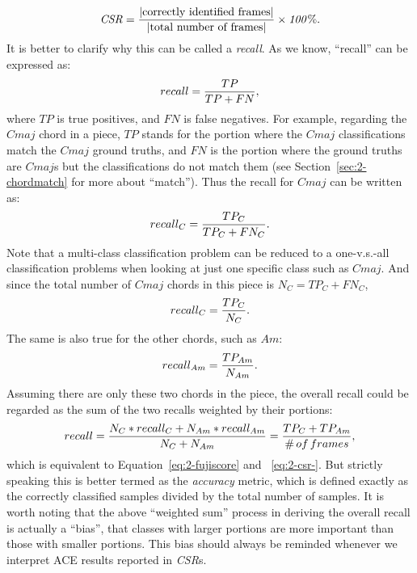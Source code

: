 \begin{equation}\label{eq:2-csr-}
\mathit{CSR={|\text{correctly identified frames}| \over |\text{total number of frames}|}\times 100\%}.
\end{equation}
It is better to clarify why this can be called a \textit{recall}. As we know, ``recall'' can be expressed as:
\begin{equation}
recall = {TP \over {TP + FN}},
\end{equation}
where $TP$ is true positives, and $FN$ is false negatives. For example, regarding the $Cmaj$ chord in a piece, $TP$ stands for the portion where the $Cmaj$ classifications match the $Cmaj$ ground truths, and $FN$ is the portion where the ground truths are $Cmaj$s but the classifications do not match them (see Section~\ref{sec:2-chordmatch} for more about ``match''). Thus the recall for $Cmaj$ can be written as:
\begin{equation}
recall_C = {TP_C \over {TP_C + FN_C}}.
\end{equation}
Note that a multi-class classification problem can be reduced to a one-v.s.-all classification problems when looking at just one specific class such as $Cmaj$. And since the total number of $Cmaj$ chords in this piece is $N_C = TP_C + FN_C$,
\begin{equation}
recall_C = {TP_C \over N_C}.
\end{equation}
The same is also true for the other chords, such as $Am$:
\begin{equation}
recall_{Am}= {TP_{Am} \over N_{Am}}.
\end{equation}
Assuming there are only these two chords in the piece, the overall recall could be regarded as the sum of the two recalls weighted by their portions:
\begin{equation}
recall = {{N_C * recall_C + N_{Am} * recall_{Am}} \over {N_C + N_{Am}}} = {{TP_C + TP_{Am}} \over {\#\,of\,frames}},
\end{equation}
which is equivalent to Equation~\ref{eq:2-fujiscore} and ~\ref{eq:2-csr-}. But strictly speaking this is better termed as the \textit{accuracy} metric, which is defined exactly as the correctly classified samples divided by the total number of samples. It is worth noting that the above ``weighted sum'' process in deriving the overall recall is actually a ``bias'', that classes with larger portions are more important than those with smaller portions. This bias should always be reminded whenever we interpret ACE results reported in \textit{CSR}s.

